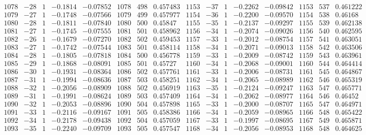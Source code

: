 \documentclass[11pt,reqno,a4letter]{article}
\numberwithin{figure}{section}
\numberwithin{table}{section}
\theoremstyle{plain}
\numberwithin{theorem}{section}
\theoremstyle{definition}
\begin{document}
\begin{table}[ht]
\begin{equation*}
{\begin{array}{ccccc|ccc|ccccc|ccc}
 1078 & -28 & 1 & -0.1814 & -0.07852 & 1078 & 498 & 0.457483 & 1153 & -37 & 1 & -0.2262 & -0.09842 & 1153 & 537 & 0.461222 \\
 1079 & -27 & 1 & -0.1748 & -0.07566 & 1079 & 499 & 0.457977 & 1154 & -36 & 1 & -0.2200 & -0.09570 & 1154 & 538 & 0.46168 \\
 1080 & -28 & 1 & -0.1811 & -0.07840 & 1080 & 500 & 0.45847 & 1155 & -35 & 1 & -0.2137 & -0.09297 & 1155 & 539 & 0.462138 \\
 1081 & -27 & 1 & -0.1745 & -0.07555 & 1081 & 501 & 0.458962 & 1156 & -34 & 1 & -0.2074 & -0.09026 & 1156 & 540 & 0.462595 \\
 1082 & -26 & 1 & -0.1679 & -0.07270 & 1082 & 502 & 0.459453 & 1157 & -33 & 1 & -0.2012 & -0.08754 & 1157 & 541 & 0.463051 \\
 1083 & -27 & 1 & -0.1742 & -0.07544 & 1083 & 501 & 0.458114 & 1158 & -34 & 1 & -0.2071 & -0.09013 & 1158 & 542 & 0.463506 \\
 1084 & -28 & 1 & -0.1805 & -0.07818 & 1084 & 500 & 0.456778 & 1159 & -33 & 1 & -0.2009 & -0.08742 & 1159 & 543 & 0.463961 \\
 1085 & -29 & 1 & -0.1868 & -0.08091 & 1085 & 501 & 0.45727 & 1160 & -34 & 1 & -0.2068 & -0.09001 & 1160 & 544 & 0.464414 \\
 1086 & -30 & 1 & -0.1931 & -0.08364 & 1086 & 502 & 0.457761 & 1161 & -33 & 1 & -0.2006 & -0.08731 & 1161 & 545 & 0.464867 \\
 1087 & -31 & 1 & -0.1994 & -0.08636 & 1087 & 503 & 0.458251 & 1162 & -34 & 1 & -0.2065 & -0.08989 & 1162 & 546 & 0.465319 \\
 1088 & -32 & 1 & -0.2056 & -0.08909 & 1088 & 502 & 0.456919 & 1163 & -35 & 1 & -0.2124 & -0.09247 & 1163 & 547 & 0.465771 \\
 1089 & -31 & 1 & -0.1991 & -0.08624 & 1089 & 503 & 0.457409 & 1164 & -34 & 1 & -0.2062 & -0.08977 & 1164 & 546 & 0.46452 \\
 1090 & -32 & 1 & -0.2053 & -0.08896 & 1090 & 504 & 0.457898 & 1165 & -33 & 1 & -0.2000 & -0.08707 & 1165 & 547 & 0.464971 \\
 1091 & -33 & 1 & -0.2116 & -0.09167 & 1091 & 505 & 0.458386 & 1166 & -34 & 1 & -0.2059 & -0.08965 & 1166 & 548 & 0.465422 \\
 1092 & -34 & 1 & -0.2178 & -0.09438 & 1092 & 504 & 0.457059 & 1167 & -33 & 1 & -0.1997 & -0.08695 & 1167 & 549 & 0.465871 \\
 1093 & -35 & 1 & -0.2240 & -0.09709 & 1093 & 505 & 0.457547 & 1168 & -34 & 1 & -0.2056 & -0.08953 & 1168 & 548 & 0.464625 \\

\end{array}}
\end{equation*}
\end{table}
\end{document}
